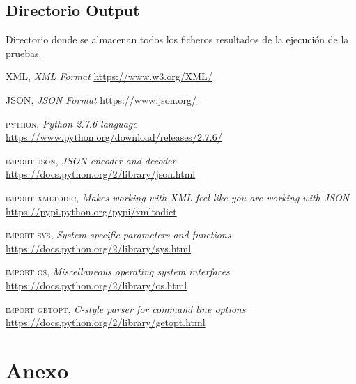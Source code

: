 \documentclass[a4paper,11pt]{book}
\begin{document}
\section{Directorio Output}
Directorio donde se almacenan todos los ficheros resultados de la ejecución de la pruebas. 

 

\begin{thebibliography}{aaaa}


 \textsc{XML},
\textit{XML Format}
\url{https://www.w3.org/XML/} 


 \textsc{JSON},
\textit{JSON Format}
\url{https://www.json.org/} 


 \textsc{python},
\textit{Python 2.7.6 language}
\url{https://www.python.org/download/releases/2.7.6/} 


 \textsc{import json},
\textit{JSON encoder and decoder}
\url{https://docs.python.org/2/library/json.html} 

 \textsc{import xmltodic},
\textit{Makes working with XML feel like you are working with JSON}
\url{https://pypi.python.org/pypi/xmltodict} 

 \textsc{import sys},
\textit{System-specific parameters and functions}
\url{https://docs.python.org/2/library/sys.html} 

 \textsc{import os},
\textit{Miscellaneous operating system interfaces}
\url{https://docs.python.org/2/library/os.html} 

 \textsc{import getopt},
\textit{C-style parser for command line options}
\url{https://docs.python.org/2/library/getopt.html}


\end{thebibliography}
 

\chapter{Anexo}
\end{document}
